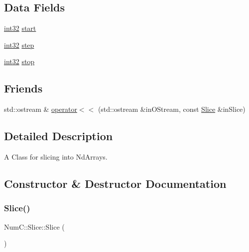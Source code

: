 \subsection*{Data Fields}
\begin{DoxyCompactItemize}
\item 
\mbox{\hyperlink{namespace_num_c_aa5a7e69266097d55816d4cdb19542b53}{int32}} \mbox{\hyperlink{class_num_c_1_1_slice_a9be315d782553b06c6af8256ef80e311}{start}}
\item 
\mbox{\hyperlink{namespace_num_c_aa5a7e69266097d55816d4cdb19542b53}{int32}} \mbox{\hyperlink{class_num_c_1_1_slice_a95060e2e1c9a2adbf1f6d0f58d1dd951}{step}}
\item 
\mbox{\hyperlink{namespace_num_c_aa5a7e69266097d55816d4cdb19542b53}{int32}} \mbox{\hyperlink{class_num_c_1_1_slice_ab71a753be2f3a9fff01c71734e4368bb}{stop}}
\end{DoxyCompactItemize}
\subsection*{Friends}
\begin{DoxyCompactItemize}
\item 
std\+::ostream \& \mbox{\hyperlink{class_num_c_1_1_slice_ad6889d2df295fef3796aebb769b8cac0}{operator$<$$<$}} (std\+::ostream \&in\+O\+Stream, const \mbox{\hyperlink{class_num_c_1_1_slice}{Slice}} \&in\+Slice)
\end{DoxyCompactItemize}


\subsection{Detailed Description}
A Class for slicing into Nd\+Arrays. 

\subsection{Constructor \& Destructor Documentation}
\mbox{\label{class_num_c_1_1_slice_a56efe4551fe9b0f75283abee2b036b80}} 
\subsubsection{\texorpdfstring{Slice()}{Slice()}\hspace{0.1cm}{\footnotesize\ttfamily [1/4]}}
{\footnotesize\ttfamily Num\+C\+::\+Slice\+::\+Slice (\begin{DoxyParamCaption}{ }\end{DoxyParamCaption})\hspace{0.3cm}{\ttfamily [inline]}}

